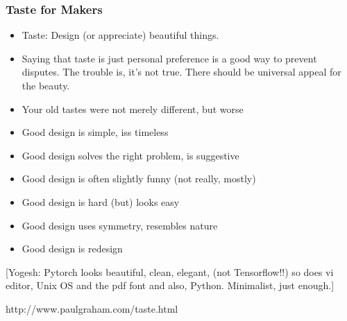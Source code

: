\begin{frame}[fragile]\frametitle{Taste for Makers}

\begin{itemize}
\item Taste: Design (or appreciate) beautiful things.
\item Saying that taste is just personal preference is a good way to prevent disputes. The trouble is, it's not true. There should be universal appeal for the beauty.
\item Your old tastes were not merely different, but worse
\item Good design is simple, iss timeless
\item Good design solves the right problem, is suggestive
\item Good design is often slightly funny (not really, mostly)
\item Good design is hard (but) looks easy
\item Good design uses symmetry, resembles nature
\item Good design is redesign
\end{itemize}

[Yogesh: Pytorch looks beautiful, clean, elegant, (not Tensorflow!!) so does vi editor, Unix OS and the pdf font and also, Python. Minimalist, just enough.]

{\tiny http://www.paulgraham.com/taste.html}

\end{frame}
